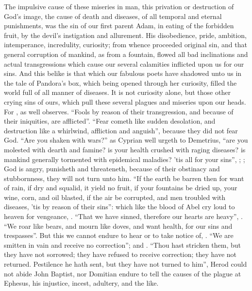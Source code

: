The impulsive cause of these miseries in man, this privation or destruction of
God's image, the cause of death and diseases, of all temporal and eternal
punishments, was the sin of our first parent Adam, in
eating of the forbidden fruit, by the devil's instigation and allurement. His
disobedience, pride, ambition, intemperance, incredulity, curiosity; from
whence proceeded original sin, and that general corruption of mankind, as from
a fountain, flowed all bad inclinations and actual transgressions which cause
our several calamities inflicted upon us for our sins. And this belike is that
which our fabulous poets have shadowed unto us in the tale of
Pandora's box, which being opened through her curiosity,
filled the world full of all manner of diseases. It is not curiosity alone, but
those other crying sins of ours, which pull these several plagues and miseries
upon our heads. For , as
\Chrysostom{} well observes. \enquote{Fools by
reason of their transgression, and because of their iniquities, are afflicted}.
\enquote{Fear cometh like sudden desolation, and destruction like a
whirlwind, affliction and anguish}, because they did not fear God.
\enquote{Are you shaken with wars?} as Cyprian well urgeth to
Demetrius, \enquote{are you molested with dearth and famine? is your health crushed
with raging diseases? is mankind generally tormented with epidemical maladies?
'tis all for your sins}, ; ;
 God is angry, punisheth and threateneth, because of
their obstinacy and stubbornness, they will not turn unto him.
\enquote{If the earth be barren then for want of rain, if dry and
squalid, it yield no fruit, if your fountains be dried up, your wine, corn, and
oil blasted, if the air be corrupted, and men troubled with diseases, 'tis by
reason of their sins}: which like the blood of Abel cry loud to heaven for
vengeance, . \enquote{That we have sinned, therefore our
hearts are heavy}, . \enquote{We roar like bears, and
mourn like doves, and want health, \etc{} for our sins and trespasses}. But
this we cannot endure to hear or to take notice of, .
\enquote{We are smitten in vain and receive no correction}; and . \enquote{Thou hast stricken them, but they have not sorrowed; they have refused to
receive correction; they have not returned. Pestilence he hath sent, but they
have not turned to him},  Herod
could not abide John Baptist, nor Domitian endure
\Apollonius{} to tell the causes of the plague at Ephesus, his injustice, incest,
adultery, and the like.

